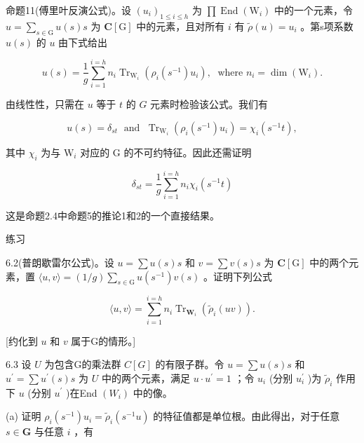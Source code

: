 \documentclass[10pt]{article}
\begin{document}
命题11(傅里叶反演公式)。设 \({\left( {u}_{i}\right) }_{1 \leq  i \leq  h}\) 为 \(\prod \operatorname{End}\left( {\mathrm{W}}_{i}\right)\) 中的一个元素，令 \(u = \mathop{\sum }\limits_{{s \in  \mathrm{G}}}u\left( s\right) s\) 为 \(\mathbf{C}\left\lbrack  \mathrm{G}\right\rbrack\) 中的元素，且对所有 \(i\) 有 \(\widetilde{\rho }\left( u\right)  = {u}_{i}\) 。第s项系数 \(u\left( s\right)\) 的 \(u\) 由下式给出

\[
u\left( s\right)  = \frac{1}{g}\mathop{\sum }\limits_{{i = 1}}^{{i = h}}{n}_{i}{\operatorname{Tr}}_{{\mathrm{W}}_{i}}\left( {{\rho }_{i}\left( {s}^{-1}\right) {u}_{i}}\right) ,\;\text{ where }{n}_{i} = \dim \left( {\mathrm{W}}_{i}\right) .
\]

由线性性，只需在 \(u\) 等于 \(t\) 的 \(G\) 元素时检验该公式。我们有

\[
u\left( s\right)  = {\delta }_{st}\;\text{ and }\;{\operatorname{Tr}}_{{\mathrm{W}}_{i}}\left( {{\rho }_{i}\left( {s}^{-1}\right) {u}_{i}}\right)  = {\chi }_{i}\left( {{s}^{-1}t}\right) ,
\]

其中 \({\chi }_{i}\) 为与 \({\mathrm{W}}_{i}\) 对应的 \(\mathrm{G}\) 的不可约特征。因此还需证明

\[
{\delta }_{st} = \frac{1}{g}\mathop{\sum }\limits_{{i = 1}}^{{i = h}}{n}_{i}{\chi }_{i}\left( {{s}^{-1}t}\right)
\]

这是命题2.4中命题5的推论1和2的一个直接结果。

练习

6.2(普朗歇雷尔公式)。设 \(u = \sum u\left( s\right) s\) 和 \(v = \sum v\left( s\right) s\) 为 \(\mathbf{C}\left\lbrack  \mathrm{G}\right\rbrack\) 中的两个元素，置 \(\langle u,v\rangle  = \left( {1/g}\right) \mathop{\sum }\limits_{{s \in  \mathrm{G}}}u\left( {s}^{-1}\right) v\left( s\right)\) 。证明下列公式

\[
\langle u,v\rangle  = \mathop{\sum }\limits_{{i = 1}}^{{i = h}}{n}_{i}{\operatorname{Tr}}_{{\mathbf{W}}_{i}}\left( {{\widetilde{\rho }}_{i}\left( {uv}\right) }\right) .
\]

[约化到 \(u\) 和 \(v\) 属于G的情形。]

6.3 设 \(U\) 为包含G的乘法群 \(C\left\lbrack  G\right\rbrack\) 的有限子群。令 \(u = \sum u\left( s\right) s\) 和 \({u}^{\prime } = \sum {u}^{\prime }\left( s\right) s\) 为 \(U\) 中的两个元素，满足 \(u \cdot  {u}^{\prime } = 1\) ；令 \({u}_{i}\) (分别 \({u}_{i}^{\prime }\) )为 \({\widetilde{\rho }}_{i}\) 作用下 \(u\) (分别 \({u}^{\prime }\) )在End \(\left( {W}_{i}\right)\) 中的像。

(a) 证明 \({\rho }_{i}\left( {s}^{-1}\right) {u}_{i} = {\widetilde{\rho }}_{i}\left( {{s}^{-1}u}\right)\) 的特征值都是单位根。由此得出，对于任意 \(s \in  \mathbf{G}\) 与任意 \(i\) ，有
\end{document}
